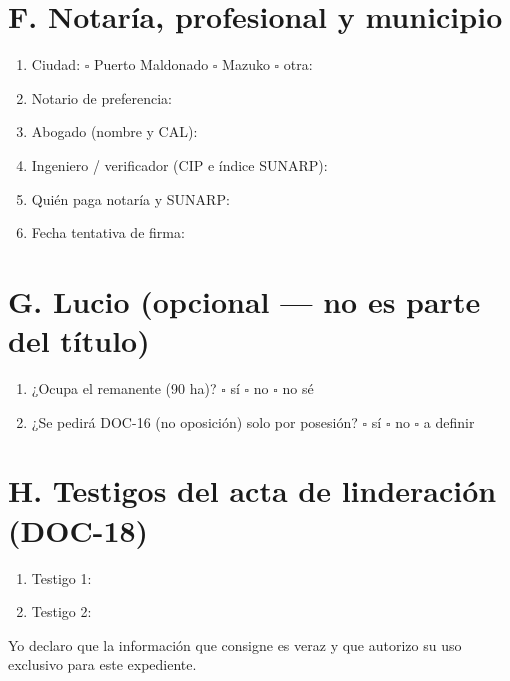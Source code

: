 \documentclass[12pt,a4paper]{article}
\begin{document}
\section*{F. Notaría, profesional y municipio}
\begin{enumerate}[leftmargin=1.15cm]
\item Ciudad: \quad $\square$ Puerto Maldonado \quad $\square$ Mazuko \quad $\square$ otra: \linea[4cm]
\item Notario de preferencia: \linea[11.2cm]
\item Abogado (nombre y CAL): \linea[11.2cm]
\item Ingeniero / verificador (CIP e índice SUNARP): \linea[11.2cm]
\item Quién paga notaría y SUNARP: \linea[9.4cm]
\item Fecha tentativa de firma: \linea[10.5cm]
\end{enumerate}

\section*{G. Lucio (opcional --- no es parte del título)}
\begin{enumerate}[leftmargin=1.15cm]
\item ¿Ocupa el remanente (90 ha)? \quad $\square$ sí \quad $\square$ no \quad $\square$ no sé
\item ¿Se pedirá DOC-16 (no oposición) solo por posesión? \quad $\square$ sí \quad $\square$ no \quad $\square$ a definir
\end{enumerate}

\section*{H. Testigos del acta de linderación (DOC-18)}
\begin{enumerate}[leftmargin=1.15cm]
\item Testigo 1: \linea[12.2cm]
\item Testigo 2: \linea[12.2cm]
\end{enumerate}

\vspace{0.5em}
\noindent Yo declaro que la información que consigne es veraz y que autorizo su uso exclusivo para este expediente.

\vspace{0.4em}
\end{document}
